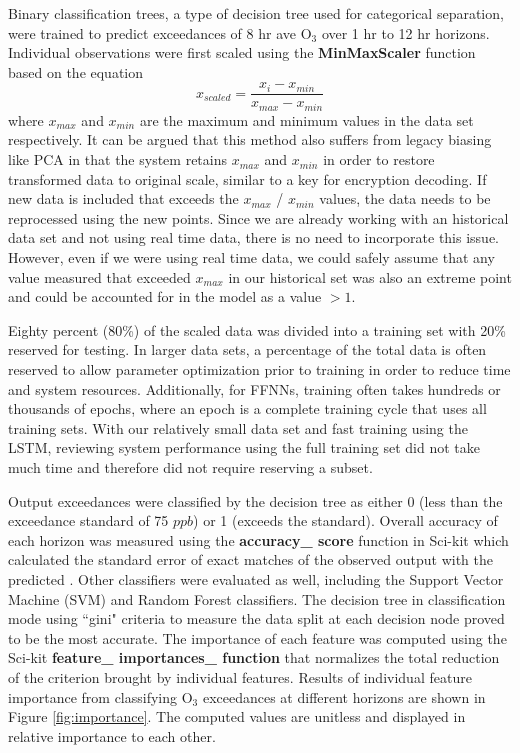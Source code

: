 Binary classification trees, a type of decision tree used for categorical separation,  were trained to predict exceedances of 8 hr ave O$_{3}$ over 1 hr to 12 hr horizons. Individual observations were first scaled using the \textbf{MinMaxScaler} function based on the equation
%
\begin{equation}
\label{eq:MaxMin}
x_{scaled} = \frac{x_{i} - x_{min}}{x_{max} - x_{min}}
\end{equation}
%
\noindent
where $x_{max}$ and $x_{min}$ are the maximum and minimum values in the data set respectively. It can be argued that this method also suffers from legacy biasing like PCA in that the system retains $x_{max}$ and $x_{min}$ in order to restore transformed data to original scale, similar to a key for encryption decoding. If new data is included that exceeds the $x_{max}$ / $x_{min}$ values, the data needs to be reprocessed using the new points. Since we are already working with an historical data set and not using real time data, there is no need to incorporate this issue. However, even if we were using real time data, we could safely assume that any value measured that exceeded $x_{max}$ in our historical set was also an extreme point and could be accounted for in the model as a value $>1$. 

Eighty percent (80\%) of the scaled data was divided into a training set with 20\% reserved for testing.  In larger data sets, a percentage of the total data is often reserved to allow parameter optimization prior to training in order to reduce time and system resources. Additionally, for FFNNs, training often takes hundreds or thousands of epochs, where an epoch is a complete training cycle that uses all training sets. With our relatively small data set and fast training using the LSTM, reviewing system performance using the full training set did not take much time and therefore did not require reserving a subset.

Output exceedances were classified by the decision tree as either 0 (less than the exceedance standard of 75 $ppb$) or 1 (exceeds the standard). Overall accuracy of each horizon was measured using the \textbf{accuracy\_ score} function in Sci-kit which calculated the standard error of exact matches of the observed output with the predicted \citep{Raschka2016}.  Other classifiers were evaluated as well, including the Support Vector Machine (SVM) and Random Forest classifiers. The decision tree in classification mode using ``gini" criteria to measure the data split at each decision node proved to be the most accurate. The importance of each feature was computed using the Sci-kit \textbf{feature\_ importances\_ function} that normalizes the total reduction of the criterion brought by individual features. Results of individual feature importance from classifying O$_{3}$ exceedances at different horizons are shown in Figure \ref{fig:importance}. The computed values are unitless and displayed in relative importance to each other.

